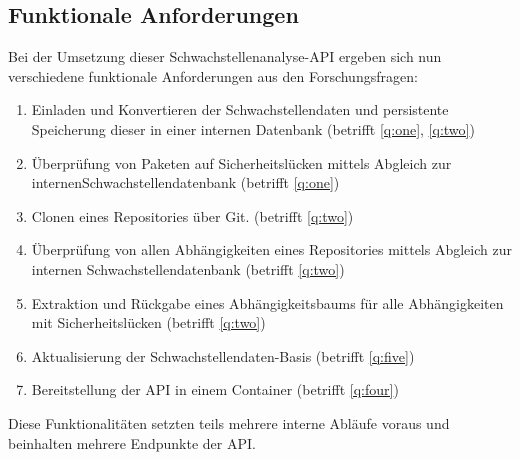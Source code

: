 \subsection{Funktionale Anforderungen} \label{sec:Funktionale_Anforderungen}
    Bei der Umsetzung dieser Schwachstellenanalyse-\ac{API} ergeben sich nun verschiedene funktionale Anforderungen aus den Forschungsfragen:
    \begin{enumerate}[label=\textbf{FRQ-\Roman*}, leftmargin=2.5cm]
        \item Einladen und Konvertieren der Schwachstellendaten und persistente Speicherung dieser in einer internen Datenbank (betrifft \ref{q:one}, \ref{q:two})\label{f:one}
        \item Überprüfung von Paketen auf Sicherheitslücken mittels Abgleich zur internen\linebreak[4] Schwachstellendatenbank (betrifft \ref{q:one}) \label{f:two}
        \item Clonen eines Repositories über Git. (betrifft \ref{q:two}) \label{f:three}
        \item Überprüfung von allen Abhängigkeiten eines Repositories mittels Abgleich zur internen Schwachstellendatenbank (betrifft \ref{q:two}) \label{f:four}
        \item Extraktion und Rückgabe eines Abhängigkeitsbaums für alle Abhängigkeiten mit Sicherheits\-lücken (betrifft \ref{q:two}) \label{f:five}
        \item Aktualisierung der Schwachstellendaten-Basis (betrifft \ref{q:five}) \label{f:six}
        \item Bereitstellung der \ac{API} in einem Container (betrifft \ref{q:four}) \label{f:seven}
    \end{enumerate}
    Diese Funktionalitäten setzten teils mehrere interne Abläufe voraus und beinhalten mehrere Endpunkte der \ac{API}.
